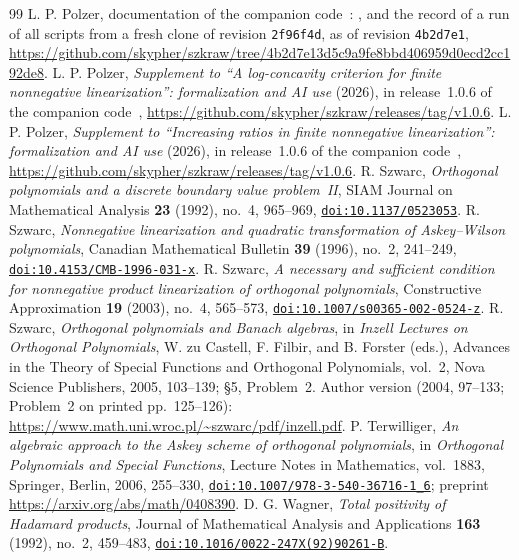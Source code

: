 \begin{thebibliography}{99}
 L. P. Polzer, documentation of the companion code~\cite{code}: ,  and the record  of a run of all scripts from a fresh clone of revision \texttt{2f96f4d}, as of revision \texttt{4b2d7e1}, \url{https://github.com/skypher/szkraw/tree/4b2d7e13d5c9a9fe8bbd406959d0ecd2cc192de8}.
 L. P. Polzer, \emph{Supplement to ``A log-concavity criterion for finite nonnegative linearization'': formalization and AI use} (2026), in release~1.0.6 of the companion code~\cite{code}, \url{https://github.com/skypher/szkraw/releases/tag/v1.0.6}.
 L. P. Polzer, \emph{Supplement to ``Increasing ratios in finite nonnegative linearization'': formalization and AI use} (2026), in release~1.0.6 of the companion code~\cite{code}, \url{https://github.com/skypher/szkraw/releases/tag/v1.0.6}.
 R. Szwarc, \emph{Orthogonal polynomials and a discrete boundary value problem~II}, SIAM Journal on Mathematical Analysis \textbf{23} (1992), no.~4, 965--969, \href{https://doi.org/10.1137/0523053}{\nolinkurl{doi:10.1137/0523053}}.
 R. Szwarc, \emph{Nonnegative linearization and quadratic transformation of Askey--Wilson polynomials}, Canadian Mathematical Bulletin \textbf{39} (1996), no.~2, 241--249, \href{https://doi.org/10.4153/CMB-1996-031-x}{\nolinkurl{doi:10.4153/CMB-1996-031-x}}.
 R. Szwarc, \emph{A necessary and sufficient condition for nonnegative product linearization of orthogonal polynomials}, Constructive Approximation \textbf{19} (2003), no.~4, 565--573, \href{https://doi.org/10.1007/s00365-002-0524-z}{\nolinkurl{doi:10.1007/s00365-002-0524-z}}.
 R. Szwarc, \emph{Orthogonal polynomials and Banach algebras}, in \emph{Inzell Lectures on Orthogonal Polynomials}, W. zu Castell, F. Filbir, and B. Forster (eds.), Advances in the Theory of Special Functions and Orthogonal Polynomials, vol.~2, Nova Science Publishers, 2005, 103--139; \S5, Problem~2. Author version (2004, 97--133; Problem~2 on printed pp.~125--126): \url{https://www.math.uni.wroc.pl/~szwarc/pdf/inzell.pdf}.
 P. Terwilliger, \emph{An algebraic approach to the Askey scheme of orthogonal polynomials}, in \emph{Orthogonal Polynomials and Special Functions}, Lecture Notes in Mathematics, vol.~1883, Springer, Berlin, 2006, 255--330, \href{https://doi.org/10.1007/978-3-540-36716-1_6}{\nolinkurl{doi:10.1007/978-3-540-36716-1_6}}; preprint \url{https://arxiv.org/abs/math/0408390}.
 D. G. Wagner, \emph{Total positivity of Hadamard products}, Journal of Mathematical Analysis and Applications \textbf{163} (1992), no.~2, 459--483, \href{https://doi.org/10.1016/0022-247X(92)90261-B}{\nolinkurl{doi:10.1016/0022-247X(92)90261-B}}.

\end{thebibliography}
